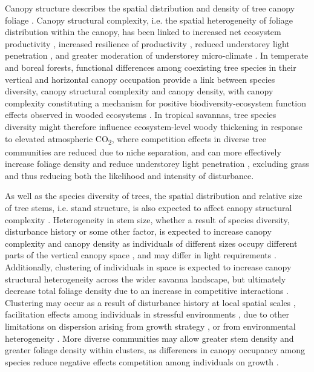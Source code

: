 \begin{refsection}
Canopy structure describes the spatial distribution and density of tree canopy foliage \citep{Lowman2004}. Canopy structural complexity, i.e. the spatial heterogeneity of foliage distribution within the canopy, has been linked to increased net ecosystem productivity \citep{Gough2019, Hardiman2011, Chen2012, Law2001, Baldocchi2001, Morin2015}, increased resilience of productivity \citep{Pretzsch2014}, reduced understorey light penetration \citep{Scheuermann2018, Sercu2017, Fotis2018}, and greater moderation of understorey micro-climate \citep{Wright2017}. In temperate and boreal forests, functional differences among coexisting tree species in their vertical and horizontal canopy occupation provide a link between species diversity, canopy structural complexity and canopy density, with canopy complexity constituting a mechanism for positive biodiversity-ecosystem function effects observed in wooded ecosystems \citep{Pretzsch2014, Barry2019}. In tropical savannas, tree species diversity might therefore influence ecosystem-level woody thickening in response to elevated atmospheric CO\textsubscript{2}, where competition effects in diverse tree communities are reduced due to niche separation, and can more effectively increase foliage density and reduce understorey light penetration \citep{Sercu2017}, excluding grass and thus reducing both the likelihood and intensity of disturbance. 

As well as the species diversity of trees, the spatial distribution and relative size of tree stems, i.e. stand structure, is also expected to affect canopy structural complexity \citep{Stark2015}. Heterogeneity in stem size, whether a result of species diversity, disturbance history or some other factor, is expected to increase canopy complexity and canopy density as individuals of different sizes occupy different parts of the vertical canopy space \citep{Panzou2020}, and may differ in light requirements \citep{CharlesDominique2018}. Additionally, clustering of individuals in space is expected to increase canopy structural heterogeneity across the wider savanna landscape, but ultimately decrease total foliage density due to an increase in competitive interactions \citep{Dohn2017}. Clustering may occur as a result of disturbance history at local spatial scales \citep{Schertzer2015, Groen2007}, facilitation effects among individuals in stressful environments \citep{Ratcliffe2017}, due to other limitations on dispersion arising from growth strategy \citep{Silva2011}, or from environmental heterogeneity \citep{Getzin2008}. More diverse communities may allow greater stem density and greater foliage density within clusters, as differences in canopy occupancy among species reduce negative effects competition among individuals on growth \citep{Gough2019}.


\end{refsection}
